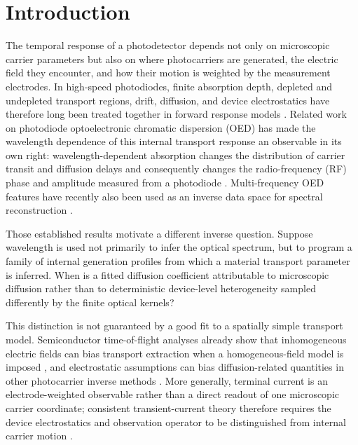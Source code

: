 \documentclass[aps,pra,twocolumn,superscriptaddress,nofootinbib]{revtex4-2}
\begin{document}
\section{Introduction}

The temporal response of a photodetector depends not only on microscopic carrier parameters but also on where photocarriers are generated, the electric field they encounter, and how their motion is weighted by the measurement electrodes. In high-speed photodiodes, finite absorption depth, depleted and undepleted transport regions, drift, diffusion, and device electrostatics have therefore long been treated together in forward response models \cite{hu2015pda}. Related work on photodiode optoelectronic chromatic dispersion (OED) has made the wavelength dependence of this internal transport response an observable in its own right: wavelength-dependent absorption changes the distribution of carrier transit and diffusion delays and consequently changes the radio-frequency (RF) phase and amplitude measured from a photodiode \cite{glasser2021oed,liokumovitch2021germanium,liokumovitch2022femtometer,dutta2024pin,mudgal2024pn}. Multi-frequency OED features have recently also been used as an inverse data space for spectral reconstruction \cite{kassa2026spectroscopy}.

Those established results motivate a different inverse question. Suppose wavelength is used not primarily to infer the optical spectrum, but to program a family of internal generation profiles from which a material transport parameter is inferred. When is a fitted diffusion coefficient attributable to microscopic diffusion rather than to deterministic device-level heterogeneity sampled differently by the finite optical kernels?

This distinction is not guaranteed by a good fit to a spatially simple transport model. Semiconductor time-of-flight analyses already show that inhomogeneous electric fields can bias transport extraction when a homogeneous-field model is imposed \cite{emelianova2006tof}, and electrostatic assumptions can bias diffusion-related quantities in other photocarrier inverse methods \cite{hattori1992sspg}. More generally, terminal current is an electrode-weighted observable rather than a direct readout of one microscopic carrier coordinate; consistent transient-current theory therefore requires the device electrostatics and observation operator to be distinguished from internal carrier motion \cite{hawks2015current}.
\end{document}
